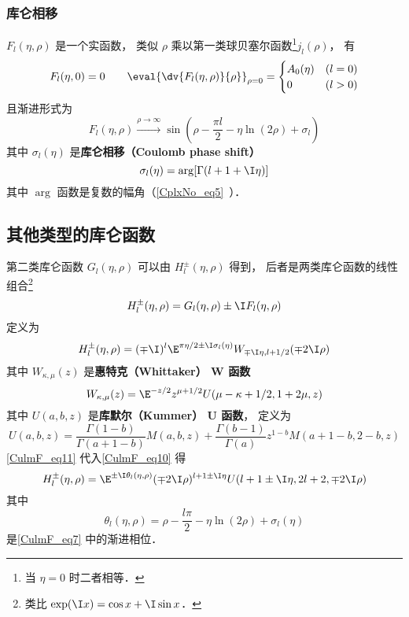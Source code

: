 \subsubsection{库仑相移}
$F_l(\eta, \rho)$ 是一个实函数， 类似 $\rho$ 乘以第一类球贝塞尔函数\footnote{当 $\eta = 0$ 时二者相等．}$j_l(\rho)$， 有
\begin{equation}
F_l(\eta, 0) = 0 \qquad \eval{\dv{F_l(\eta, \rho)}{\rho}}_{\rho=0} = 
\begin{cases}
A_0(\eta) &(l = 0)\\
0     &(l > 0)
\end{cases}
\end{equation}
且渐进形式为
\begin{equation}\label{CulmF_eq7}
F_l(\eta, \rho) \overset{\rho\to \infty}{\longrightarrow} \sin(\rho - \frac{\pi l}{2} - \eta\ln(2\rho) + \sigma_l)
\end{equation}
其中 $\sigma_l(\eta)$ 是\textbf{库仑相移（Coulomb phase shift）}
\begin{equation}\label{CulmF_eq8}
\sigma_l(\eta) = \arg[\Gamma(l+1+\I\eta)]
\end{equation}
其中 $\arg$ 函数是复数的幅角（\autoref{CplxNo_eq5}~）．

\subsection{其他类型的库仑函数}

第二类库仑函数 $G_l(\eta, \rho)$ 可以由 $H_l^\pm(\eta, \rho)$ 得到， 后者是两类库仑函数的线性组合\footnote{类比 $\exp(\I x) = \cos x + \I\sin x$．}
\begin{equation}
H_l^\pm(\eta, \rho) = G_l(\eta, \rho) \pm \I F_l(\eta, \rho)
\end{equation}	
定义为
\begin{equation}\label{CulmF_eq10}
H_l^\pm(\eta, \rho) = (\mp\I)^l \E^{\pi\eta/2 \pm \I \sigma_l(\eta)} W_{\mp\I\eta, l + 1/2}(\mp 2\I\rho)
\end{equation}
其中 $W_{\kappa, \mu}(z)$ 是\textbf{惠特克（Whittaker） W 函数}
\begin{equation}\label{CulmF_eq11}
W_{\kappa, \mu}(z) = \E^{-z/2} z^{\mu + 1/2} U(\mu - \kappa + 1/2, 1 + 2\mu, z)
\end{equation}
其中 $U(a, b, z)$ 是\textbf{库默尔（Kummer） U 函数}， 定义为
\begin{equation}
U(a, b, z) = \frac{\Gamma(1 - b)}{\Gamma(a + 1 - b)} M(a, b, z) + \frac{\Gamma(b - 1)}{\Gamma(a)} z^{1 - b} M(a + 1 - b, 2 - b, z)
\end{equation}
\autoref{CulmF_eq11} 代入\autoref{CulmF_eq10} 得
\begin{equation}
H_l^\pm(\eta, \rho) = \E^{\pm\I\theta_l(\eta, \rho)}(\mp 2\I\rho)^{l + 1 \pm\I\eta} U(l + 1 \pm \I\eta, 2l + 2, \mp2\I\rho)
\end{equation}
其中
\begin{equation}
\theta_l(\eta, \rho) = \rho - \frac{l\pi}{2} - \eta\ln(2\rho) + \sigma_l(\eta)
\end{equation}
是\autoref{CulmF_eq7} 中的渐进相位．

